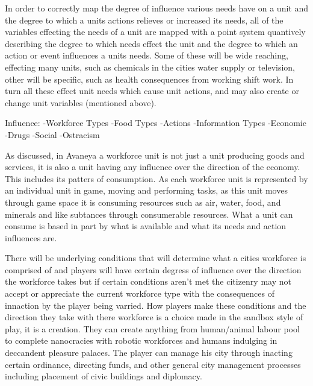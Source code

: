 In order to correctly map the degree of influence various needs have on a unit and the degree to which a units actions relieves or increased its needs, all of the variables effecting the needs of a unit are mapped with a point system quantively describing the degree to which needs effect the unit and the degree to which an action or event influences a units needs. Some of these will be wide reaching, effecting many units, such as chemicals in the cities water supply or television, other will be specific, such as health consequences from working shift work. In turn all these effect unit needs which cause unit actions, and may also create or change unit variables (mentioned above). 



Influence:
-Workforce Types
-Food Types
-Actions
-Information Types
-Economic 
-Drugs
-Social
-Ostracism



%
%
%
%
%
%
%





As discussed, in Avaneya a workforce unit is not just a unit producing goods and services, it is also a unit having any influence over the direction of the economy. This includes its patters of consumption. As each workforce unit is represented by an individual unit in game, moving and performing tasks, as this unit moves through game space it is consuming resources such as air, water, food, and minerals and like subtances through consumerable resources. What a unit can consume is based in part by what is available and what its needs and action influences are.



 



There will be underlying conditions that will determine what a cities workforce is comprised of and players will have certain degress of influence over the direction the workforce takes but if certain conditions aren't met the citizenry may not accept or appreciate the current workforce type with the consequences of innaction by the player being varried. How players make these conditions and the direction they take with there workforce is a choice made in the sandbox style of play, it is a creation. They can create anything from human/animal labour pool to complete nanocracies with robotic workforces and humans indulging in deccandent pleasure palaces. The player can manage his city through inacting certain ordinance, directing funds, and other general city management processes including placement of civic buildings and diplomacy. 
